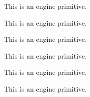 \begin{function}[]
  {
    \tracinglostchars
  }
  \begin{syntax}
  \end{syntax}
  This is an engine primitive.
\end{function}



\begin{function}[]
  {
    \tracingmacros
  }
  \begin{syntax}
  \end{syntax}
  This is an engine primitive.
\end{function}



\begin{function}[]
  {
    \tracingnesting
  }
  \begin{syntax}
  \end{syntax}
  This is an engine primitive.
\end{function}



\begin{function}[]
  {
    \tracingnone
  }
  \begin{syntax}
  \end{syntax}

\end{function}



\begin{function}[]
  {
    \tracingonline
  }
  \begin{syntax}
  \end{syntax}
  This is an engine primitive.
\end{function}



\begin{function}[]
  {
    \tracingoutput
  }
  \begin{syntax}
  \end{syntax}
  This is an engine primitive.
\end{function}



\begin{function}[]
  {
    \tracingpages
  }
  \begin{syntax}
  \end{syntax}
  This is an engine primitive.
\end{function}



